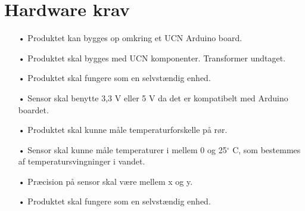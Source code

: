 \section{Hardware krav}
\begin{enumerate}
	\item[•]Produktet kan bygges op omkring et UCN Arduino board. 
	\item[•]Produktet skal bygges med UCN komponenter. Transformer undtaget.
	\item[•]Produktet skal fungere som en selvstændig enhed.
	\item[•]Sensor skal benytte 3,3 V eller 5 V da det er kompatibelt med Arduino boardet.
	\item[•]Produktet skal kunne måle temperaturforskelle på rør.
	\item[•]Sensor skal kunne måle temperaturer i mellem 0 og 25$^{\circ}$ C, som bestemmes af temperatursvingninger i vandet.
	\item[•]Præcision på sensor skal være mellem x og y. 
	\item[•]Produktet skal fungere som en selvstændig enhed.
\end{enumerate}	
